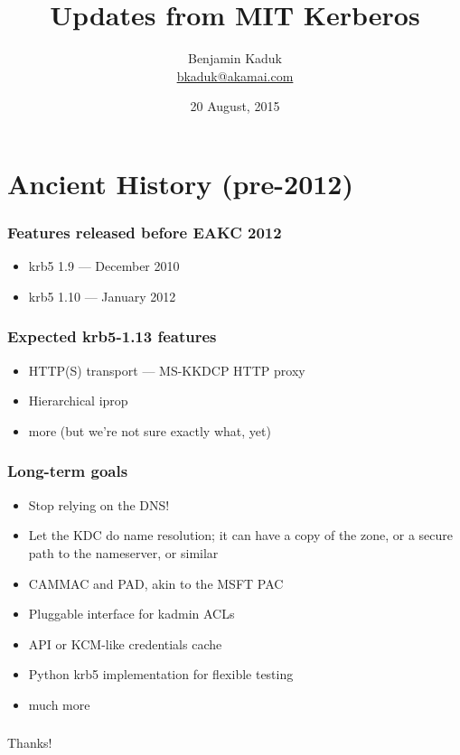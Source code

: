 \documentclass{beamer}
\title{Updates from MIT Kerberos}
\author{Benjamin Kaduk \\ \strikethrough{\url{kaduk@mit.edu}} \url{bkaduk@akamai.com}}
\date{20 August, 2015}
\begin{document}
\AtBeginSection[]
{
    \begin{frame}
	\tableofcontents[currentsection]
    \end{frame}
}

\frame{\titlepage}

\section{Ancient History (pre-2012)}

\begin{frame}[fragile]
\frametitle{Features released before EAKC 2012}
\begin{itemize}
\item{krb5 1.9 --- December 2010}
\item{krb5 1.10 --- January 2012}
\end{itemize}
\end{frame}

\begin{frame}
\frametitle{Expected krb5-1.13 features}
\begin{itemize}
\item{HTTP(S) transport --- MS-KKDCP HTTP proxy}
\item{Hierarchical iprop}
\item{more (but we're not sure exactly what, yet)}
\end{itemize}
\end{frame}

\begin{frame}
\frametitle{Long-term goals}
\begin{itemize}
\item{Stop relying on the DNS!}
\item{Let the KDC do name resolution; it can have a copy of the zone, or a
	secure path to the nameserver, or similar}
\item{CAMMAC and PAD, akin to the MSFT PAC}
\item{Pluggable interface for kadmin ACLs}
\item{API or KCM-like credentials cache}
\item{Python krb5 implementation for flexible testing}
\item{much more}
\end{itemize}
\end{frame}

\begin{frame}
\frametitle{}
\Large{Thanks!}
\end{frame}
\end{document}
